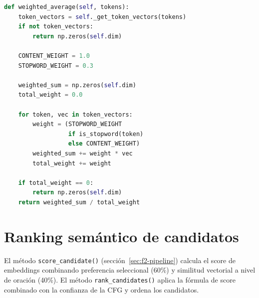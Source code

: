 \begin{lstlisting}[language=Python,caption={Composición vectorial ponderada (\texttt{vector\_composer.py}).},label={lst:weighted-average},basicstyle=\ttfamily\small,xleftmargin=1cm]
def weighted_average(self, tokens):
    token_vectors = self._get_token_vectors(tokens)
    if not token_vectors:
        return np.zeros(self.dim)

    CONTENT_WEIGHT = 1.0
    STOPWORD_WEIGHT = 0.3

    weighted_sum = np.zeros(self.dim)
    total_weight = 0.0

    for token, vec in token_vectors:
        weight = (STOPWORD_WEIGHT
                  if is_stopword(token)
                  else CONTENT_WEIGHT)
        weighted_sum += weight * vec
        total_weight += weight

    if total_weight == 0:
        return np.zeros(self.dim)
    return weighted_sum / total_weight
\end{lstlisting}

\section{Ranking semántico de candidatos}

El método \texttt{score\_candidate()} (sección~\ref{sec:f2-pipeline}) calcula el score de embeddings combinando preferencia seleccional (60\%) y similitud vectorial a nivel de oración (40\%). El método \texttt{rank\_candidates()} aplica la fórmula de score combinado con la confianza de la CFG y ordena los candidatos.

